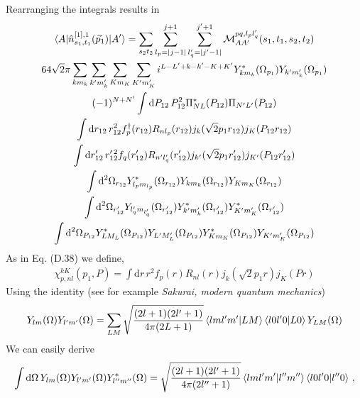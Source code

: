 \documentclass[10pt]{article}
\begin{document}
Rearranging the integrals results in
\begin{multline*}
\braket{ A | \hat{n}^{[1],1}_{s_1,t_1}(\vec{p}_1) | A'} = \sum_{s_2 t_2}  \sum_{l_p = |j-1|}^{j+1} \sum_{l_q' = |j' - 1|}^{j'+1} \mathcal{M}_{AA'}^{p q,l_p l_q'}(s_1,t_1,s_2,t_2) \\
64 \sqrt{2} \pi \sum_{k m_k} \sum_{k' m_k'} \sum_{K m_K} \sum_{K' m_K'} i^{L-L'+k-k'-K+K'} Y_{k m_k}^{*}(\Omega_{p_1}) Y_{k' m_k'}(\Omega_{p_1}) \\
 (-1)^{N+N'}\int \text{d} P_{12} \, P_{12}^{2} \Pi_{N L}^{*}(P_{12}) \Pi_{N' L'}(P_{12})\\
 \int \text{d} r_{12}\, r_{12}^{2} f_{p}^{\dagger}(r_{12}) R_{n l_p}(r_{12}) j_{k}( \sqrt{2} p_1 r_{12})  j_{K}(P_{12} r_{12}) \\
\int \text{d} r_{12}' \, r_{12}^{\prime \, 2} f_{q}(r_{12}')  R_{n' l_q'}(r_{12}') j_{k'}( \sqrt{2} p_1 r_{12}')  j_{K'}(P_{12} r_{12}') \\
 \int \text{d}^{2} \Omega_{r_{12}}  Y_{l_p m_{l_p} }^{*}(\Omega_{r_{12}}) Y_{k m_k}(\Omega_{r_{12}}) Y_{K m_K}(\Omega_{r_{12}}) \\
 \int \text{d}^{2} \Omega_{r_{12}'}  Y_{ l_q' m_{l_q'} }(\Omega_{r_{12}'})  Y_{k' m_k'}^{*}(\Omega_{r_{12}'}) Y_{K' m_K'}^{*}(\Omega_{r_{12}'}) \\
   \int \text{d}^{2} \Omega_{P_{12}}  Y_{L M_L}^{*}(\Omega_{P_{12}})  Y_{L' M_L'}(\Omega_{P_{12}}) Y_{K m_K}^{*}(\Omega_{P_{12}}) Y_{K' m_K'}(\Omega_{P_{12}})
\end{multline*}
As in Eq. (D.38) we define,
\begin{align*}
	\chi_{p,nl}^{kK}(p_1,P) = \int \text{d} r\, r^{2} f_{p}(r) R_{n l}(r) j_{k}( \sqrt{2} p_1 r)  j_{K}(P r)
\end{align*}
Using the identity (see for example \textit{Sakurai, modern quantum mechanics})
\begin{align*}
	Y_{ l m }(\Omega) Y_{ l' m'}(\Omega) = \sum_{LM} \sqrt{ \frac{(2l+1)(2l'+1)}{4 \pi (2L+1)}} \braket{ l m l' m' | L M} \braket{ l 0 l' 0 | L 0 } Y_{L M}(\Omega)
\end{align*}
We can easily derive
\begin{align*}
	\int \text{d} \Omega \, Y_{ l m }(\Omega) Y_{ l' m'}(\Omega) Y_{ l'' m''}^{*}(\Omega) = \sqrt{ \frac{(2l+1)(2l'+1)}{4 \pi (2l''+1)}} \braket{ l m l' m' | l'' m''} \braket{ l 0 l' 0 | l'' 0 } \, ,
\end{align*}
\end{document}
